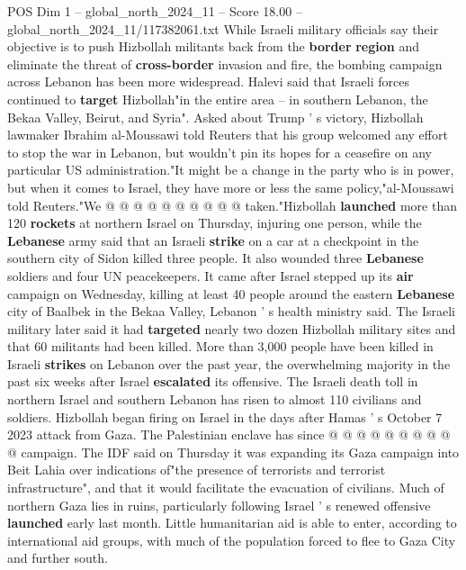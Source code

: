 \begin{textsample}{POS Dim 1 – global\_north\_2024\_11 – Score 18.00 – global\_north\_2024\_11/117382061.txt}
While Israeli military officials say their objective is to push Hizbollah militants back from the \textbf{border} \textbf{region} and eliminate the threat of \textbf{cross-border} invasion and fire, the bombing campaign across Lebanon has been more widespread.
Halevi said that Israeli forces continued to \textbf{target} Hizbollah"in the entire area -- in southern Lebanon, the Bekaa Valley, Beirut, and Syria".
Asked about Trump ' s victory, Hizbollah lawmaker Ibrahim al-Moussawi told Reuters that his group welcomed any effort to stop the war in Lebanon, but wouldn't pin its hopes for a ceasefire on any particular US administration."It might be a change in the party who is in power, but when it comes to Israel, they have more or less the same policy,"al-Moussawi told Reuters."We @ @ @ @ @ @ @ @ @ @ taken."Hizbollah \textbf{launched} more than 120 \textbf{rockets} at northern Israel on Thursday, injuring one person, while the \textbf{Lebanese} army said that an Israeli \textbf{strike} on a car at a checkpoint in the southern city of Sidon killed three people.
It also wounded three \textbf{Lebanese} soldiers and four UN peacekeepers.
It came after Israel stepped up its \textbf{air} campaign on Wednesday, killing at least 40 people around the eastern \textbf{Lebanese} city of Baalbek in the Bekaa Valley, Lebanon ' s health ministry said.
The Israeli military later said it had \textbf{targeted} nearly two dozen Hizbollah military sites and that 60 militants had been killed.
More than 3,000 people have been killed in Israeli \textbf{strikes} on Lebanon over the past year, the overwhelming majority in the past six weeks after Israel \textbf{escalated} its offensive.
The Israeli death toll in northern Israel and southern Lebanon has risen to almost 110 civilians and soldiers.
Hizbollah began firing on Israel in the days after Hamas ' s October 7 2023 attack from Gaza.
The Palestinian enclave has since @ @ @ @ @ @ @ @ @ @ campaign.
The IDF said on Thursday it was expanding its Gaza campaign into Beit Lahia over indications of"the presence of terrorists and terrorist infrastructure", and that it would facilitate the evacuation of civilians.
Much of northern Gaza lies in ruins, particularly following Israel ' s renewed offensive \textbf{launched} early last month.
Little humanitarian aid is able to enter, according to international aid groups, with much of the population forced to flee to Gaza City and further south.

\end{textsample}
